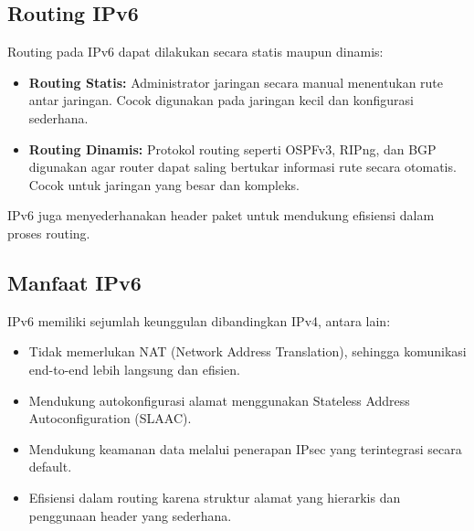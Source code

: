 \subsection*{Routing IPv6}

Routing pada IPv6 dapat dilakukan secara statis maupun dinamis:
\begin{itemize}
    \item \textbf{Routing Statis:} Administrator jaringan secara manual menentukan rute antar jaringan. Cocok digunakan pada jaringan kecil dan konfigurasi sederhana.
    \item \textbf{Routing Dinamis:} Protokol routing seperti OSPFv3, RIPng, dan BGP digunakan agar router dapat saling bertukar informasi rute secara otomatis. Cocok untuk jaringan yang besar dan kompleks.
\end{itemize}
IPv6 juga menyederhanakan header paket untuk mendukung efisiensi dalam proses routing.

\subsection*{Manfaat IPv6}

IPv6 memiliki sejumlah keunggulan dibandingkan IPv4, antara lain:
\begin{itemize}
    \item Tidak memerlukan NAT (Network Address Translation), sehingga komunikasi end-to-end lebih langsung dan efisien.
    \item Mendukung autokonfigurasi alamat menggunakan Stateless Address Autoconfiguration (SLAAC).
    \item Mendukung keamanan data melalui penerapan IPsec yang terintegrasi secara default.
    \item Efisiensi dalam routing karena struktur alamat yang hierarkis dan penggunaan header yang sederhana.
\end{itemize}

